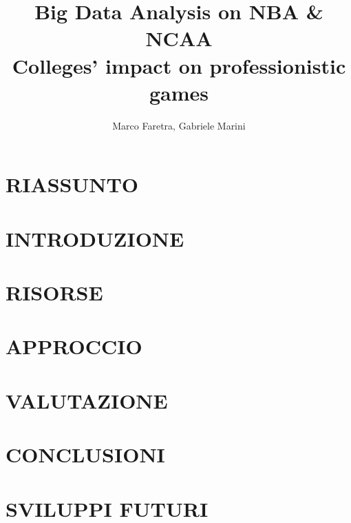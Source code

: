 \documentclass[10pt,a4paper]{article}
\author{Marco Faretra, Gabriele Marini}
\title{\textbf{Big Data Analysis on NBA \& NCAA}\\Colleges' impact on professionistic games}
\begin{document}
	
\maketitle
\thispagestyle{empty}
\pagestyle{empty}
		
\section*{RIASSUNTO}

\section{INTRODUZIONE} 

\section{RISORSE}
\section{APPROCCIO}
\section{VALUTAZIONE}

\section{CONCLUSIONI}

\section{SVILUPPI FUTURI}
\end{document}
